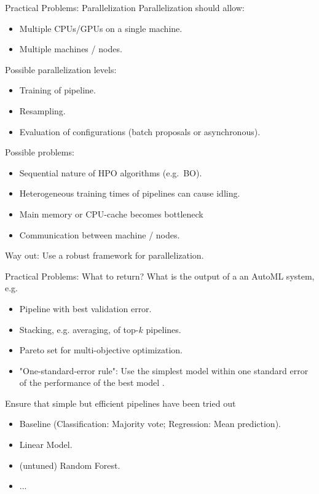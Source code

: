 	\begin{frame}{Practical Problems: Parallelization}
		Parallelization should allow:
		\begin{itemize}
			\item Multiple CPUs/GPUs on a single machine. 
			\item Multiple machines / nodes. 
		\end{itemize}
		
		Possible parallelization levels:
		\begin{itemize}
			\item Training of pipeline.
			\item Resampling.
			\item Evaluation of configurations (batch proposals or asynchronous).
		\end{itemize}
		
		Possible problems:
		\begin{itemize}
			\item Sequential nature of HPO algorithms (e.g.\ BO).
			\item Heterogeneous training times of pipelines can cause idling.
			\item Main memory or CPU-cache becomes bottleneck
			\item Communication between machine / nodes.
		\end{itemize}
	
	Way out: Use a robust framework for parallelization.

	\end{frame}
	
	\begin{frame}{Practical Problems: What to return?}
		What is the output of a an AutoML system, e.g.
		\begin{itemize}
			\item Pipeline with best validation error.
			\item Stacking, e.g. averaging, of top-$k$ pipelines.
			\item Pareto set for multi-objective optimization.
			\item "One-standard-error rule": Use the simplest model within one standard error of the performance of the best model .
		\end{itemize}
	
		Ensure that simple but efficient pipelines have been tried out 
		\begin{itemize}
			\item Baseline (Classification: Majority vote; Regression: Mean prediction).
			\item Linear Model.
			\item (untuned) Random Forest.
			\item ...
		\end{itemize}
	
	\end{frame}

